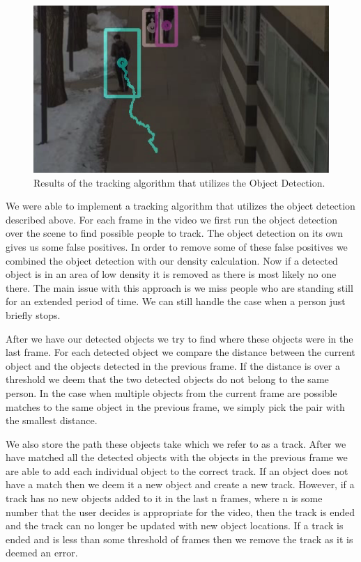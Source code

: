 \documentclass[12pt, onecolumn, conference]{IEEEtran}
\begin{document}
\begin{figure}[!t]
\centering
\includegraphics[height=2.5in]{Screenshots/OB_Tracking.png}
\caption{Results of the tracking algorithm that utilizes the Object Detection.}
\label{Tracking_Object_Detection}
\end{figure}

We were able to implement a tracking algorithm that utilizes the object detection described above. For each frame in the video we first run the object detection over the scene to find possible people to track. The object detection on its own gives us some false positives. In order to remove some of these false positives we combined the object detection with our density calculation. Now if a detected object is in an area of low density it is removed as there is most likely no one there. The main issue with this approach is we miss people who are standing still for an extended period of time. We can still handle the case when a person just briefly stops.

After we have our detected objects we try to find where these objects were in the last frame. For each detected object we compare the distance between the current object and the objects detected in the previous frame. If the distance is over a threshold we deem that the two detected objects do not belong to the same person. In the case when multiple objects from the current frame are possible matches to the same object in the previous frame, we simply pick the pair with the smallest distance.

We also store the path these objects take which we refer to as a track. After we have matched all the detected objects with the objects in the previous frame we are able to add each individual object to the correct track. If an object does not have a match then we deem it a new object and create a new track. However, if a track has no new objects added to it in the last n frames, where n is some number that the user decides is appropriate for the video, then the track is ended and the track can no longer be updated with new object locations. If a track is ended and is less than some threshold of frames then we remove the track as it is deemed an error.
\end{document}
